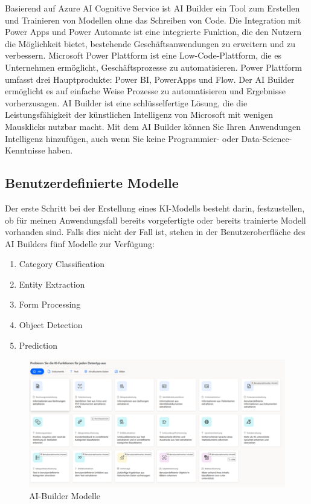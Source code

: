 Basierend auf Azure AI Cognitive Service ist AI Builder ein Tool zum Erstellen und Trainieren von Modellen ohne das Schreiben von Code. Die Integration mit Power Apps und Power Automate ist eine integrierte Funktion, die den Nutzern die Möglichkeit bietet, bestehende Geschäftsanwendungen zu erweitern und zu verbessern.
Microsoft Power Plattform ist eine Low-Code-Plattform, die es Unternehmen ermöglicht, Geschäftsprozesse zu automatisieren. Power Plattform umfasst drei Hauptprodukte: Power BI, PowerApps und Flow.
Der AI Builder ermöglicht es auf einfache Weise Prozesse zu automatisieren und Ergebnisse vorherzusagen. AI Builder ist eine schlüsselfertige Lösung, die die Leistungsfähigkeit der künstlichen Intelligenz von Microsoft mit wenigen Mausklicks nutzbar macht. Mit dem AI Builder können Sie Ihren Anwendungen Intelligenz hinzufügen, auch wenn Sie keine Programmier- oder Data-Science-Kenntnisse haben.

\subsection{Benutzerdefinierte Modelle}

Der erste Schritt bei der Erstellung eines KI-Modells besteht darin, festzustellen, ob für meinen Anwendungsfall bereits vorgefertigte oder bereits trainierte Modell vorhanden sind. Falls dies nicht der Fall ist, stehen in der Benutzeroberfläche des AI Builders fünf Modelle zur Verfügung:

\begin{enumerate}
    \item Category Classification
    \item Entity Extraction
    \item Form Processing
    \item Object Detection
    \item Prediction
\end{enumerate}

\begin{figure}[h]
    \centering
    \includegraphics[scale=0.9]{sections/cloud-computing/images/ai-builder-models.png}
    \caption{AI-Builder Modelle}
    \label{fig:kimldl-comparison}
\end{figure}

